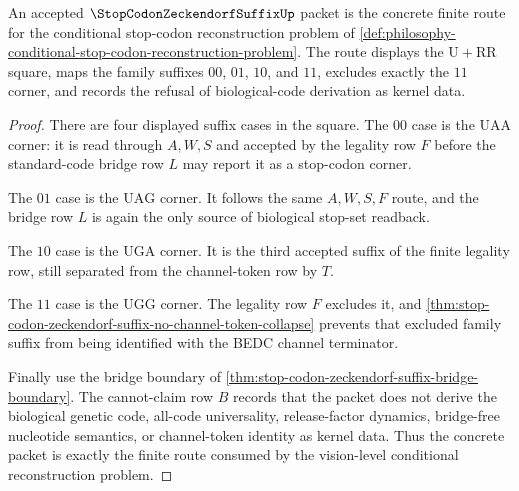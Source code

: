 \begin{theorem}
\label{thm:stop-codon-zeckendorf-vision-route}
An accepted $\StopCodonZeckendorfSuffixUp$ packet is the concrete finite route for the conditional stop-codon reconstruction problem of \autoref{def:philosophy-conditional-stop-codon-reconstruction-problem}. The route displays the $\mathrm{U}+\mathrm{RR}$ square, maps the family suffixes $00$, $01$, $10$, and $11$, excludes exactly the $11$ corner, and records the refusal of biological-code derivation as kernel data.
\end{theorem}
\begin{proof}
There are four displayed suffix cases in the square. The $00$ case is the $\mathrm{UAA}$ corner: it is read through $A,W,S$ and accepted by the legality row $F$ before the standard-code bridge row $L$ may report it as a stop-codon corner.

The $01$ case is the $\mathrm{UAG}$ corner. It follows the same $A,W,S,F$ route, and the bridge row $L$ is again the only source of biological stop-set readback.

The $10$ case is the $\mathrm{UGA}$ corner. It is the third accepted suffix of the finite legality row, still separated from the channel-token row by $T$.

The $11$ case is the $\mathrm{UGG}$ corner. The legality row $F$ excludes it, and \autoref{thm:stop-codon-zeckendorf-suffix-no-channel-token-collapse} prevents that excluded family suffix from being identified with the BEDC channel terminator.

Finally use the bridge boundary of \autoref{thm:stop-codon-zeckendorf-suffix-bridge-boundary}. The cannot-claim row $B$ records that the packet does not derive the biological genetic code, all-code universality, release-factor dynamics, bridge-free nucleotide semantics, or channel-token identity as kernel data. Thus the concrete packet is exactly the finite route consumed by the vision-level conditional reconstruction problem.
\end{proof}

